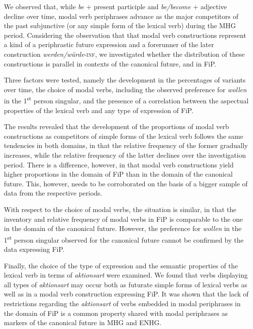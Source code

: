 \documentclass[output=paper,colorlinks,citecolor=brown]{langscibook}
\begin{document}
We observed that, while \textit{be} + present participle and \textit{be/become} + adjective decline over time, modal verb periphrases advance as the major competitors of the past subjunctive (or any simple form of the lexical verb) during the MHG period. Considering the observation that that modal verb constructions represent a kind of a periphrastic future expression and a forerunner of the later construction \textit{werden/würde}-\textsc{inf}, we investigated whether the distribution of these constructions is parallel in contexts of the canonical future, and in FiP. 

Three factors were tested, namely the development in the percentages of variants over time, the choice of modal verbs, including the observed preference for \textit{wollen} in the 1\textsuperscript{st} person singular, and the presence of a correlation between the aspectual properties of the lexical verb and any type of expression of FiP. 

The results revealed that the development of the proportions of modal verb constructions as competitors of simple forms of the lexical verb follows the same tendencies in both domains, in that the relative frequency of the former gradually increases, while the relative frequency of the latter declines over the investigation period. There is a difference, however, in that modal verb constructions yield higher proportions in the domain of FiP than in the domain of the canonical future. This, however, needs to be corroborated on the basis of a bigger sample of data from the respective periods. 

With respect to the choice of modal verbs, the situation is similar, in that the inventory and relative frequency of modal verbs in FiP is comparable to the one in the domain of the canonical future. However, the preference for \textit{wollen} in the 1\textsuperscript{st} person singular observed for the canonical future cannot be confirmed by the data expressing FiP.

Finally, the choice of the type of expression and the semantic properties of the lexical verb in terms of \textit{aktionsart} were examined. We found that verbs displaying all types of \textit{aktionsart} may occur both as futurate simple forms of lexical verbs as well as in a modal verb construction expressing FiP. It was shown that the lack of restrictions regarding the \textit{aktionsart} of verbs embedded in modal periphrases in the domain of FiP is a common property shared with modal periphrases as markers of the canonical future in MHG and ENHG.
\end{document}
